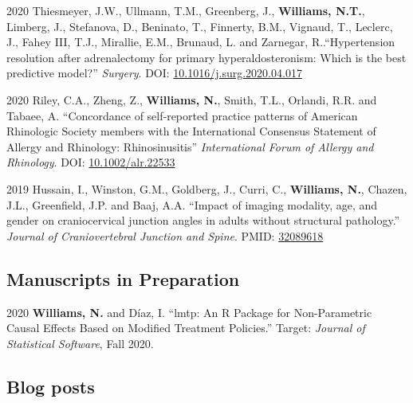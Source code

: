 \documentclass[12pt,letterpaper]{report}
\begin{document}
    \begin{tablist}
    
        	\item[2020] \tab Thiesmeyer, J.W., Ullmann, T.M., Greenberg, J., \textbf{Williams, N.T.}, Limberg, J., Stefanova, D., Beninato, T., Finnerty, B.M., Vignaud, T., Leclerc, J., Fahey III, T.J., Mirallie, E.M., Brunaud, L. and Zarnegar, R..\enquote{Hypertension resolution after adrenalectomy for primary hyperaldosteronism: Which is the best predictive model?} \textit{Surgery}. DOI: \href{https://doi.org/10.1016/j.surg.2020.04.017}{10.1016/j.surg.2020.04.017}  
	
	\item[2020] \tab Riley, C.A., Zheng, Z., \textbf{Williams, N.}, Smith, T.L., Orlandi, R.R. and Tabaee, A. \enquote{Concordance of self‐reported practice patterns of American Rhinologic Society members with the International Consensus Statement of Allergy and Rhinology: Rhinosinusitis} \textit{International Forum of Allergy and Rhinology}. DOI: \href{https://doi.org/10.1002/alr.22533}{10.1002/alr.22533} 

	\item[2019] \tab Hussain, I., Winston, G.M., Goldberg, J., Curri, C., \textbf{Williams, N.}, Chazen, J.L., Greenfield, J.P. and Baaj, A.A. \enquote{Impact of imaging modality, age, and gender on craniocervical junction angles in adults without structural pathology.} \textit{Journal of Craniovertebral Junction and Spine}. PMID: \href{https://www.ncbi.nlm.nih.gov/pubmed/32089618}{32089618}

    \end{tablist}
    
    \subsection*{Manuscripts in Preparation}
    
    \begin{tablist}
    
    \item[2020] \tab \textbf{Williams, N.} and Díaz, I. \enquote{lmtp: An R Package for Non-Parametric Causal Effects Based on Modified Treatment Policies.} Target: \textit{Journal of Statistical Software}, Fall 2020.
    
    \end{tablist}
    
    \subsection*{Blog posts}
    
\end{document}
